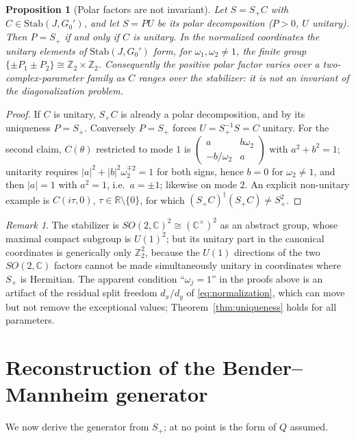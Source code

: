 \documentclass[11pt]{article}
\newtheorem{proposition}[theorem]{Proposition}
\theoremstyle{definition}
\theoremstyle{remark}
\newtheorem{remark}[theorem]{Remark}
\newcommand{\C}{\mathbb{C}}
\newcommand{\R}{\mathbb{R}}
\newcommand{\w}{\omega}
\newcommand{\Stab}{\mathrm{Stab}}
\newcommand{\dg}{\dagger}
\begin{document}
\begin{proposition}[Polar factors are not invariant]\label{prop:polar}
Let $S=S_+C$ with $C\in\Stab(J,G_0')$, and let $S=PU$ be its polar
decomposition ($P>0$, $U$ unitary).  Then $P=S_+$ if and only if $C$ is
unitary.  In the normalized coordinates the unitary elements of
$\Stab(J,G_0')$ form, for $\w_1,\w_2\neq1$, the finite group
$\{\pm P_1\pm P_2\}\cong\mathbb{Z}_2\times\mathbb{Z}_2$.  Consequently the
positive polar factor varies over a two-complex-parameter family as $C$
ranges over the stabilizer: it is not an invariant of the diagonalization
problem.
\end{proposition}

\begin{proof}
If $C$ is unitary, $S_+C$ is already a polar decomposition, and by its
uniqueness $P=S_+$.  Conversely $P=S_+$ forces $U=S_+^{-1}S=C$ unitary.  For
the second claim, $C(\theta)$ restricted to mode $1$ is
$\left(\begin{smallmatrix}a&b\w_2\\-b/\w_2&a\end{smallmatrix}\right)$ with
$a^2+b^2=1$; unitarity requires
$|a|^2+|b|^2\w_2^{\mp2}=1$ for both signs, hence $b=0$ for $\w_2\neq1$, and
then $|a|=1$ with $a^2=1$, i.e.\ $a=\pm1$; likewise on mode $2$.  An explicit
non-unitary example is $C(i\tau,0)$, $\tau\in\R\setminus\{0\}$, for which
$(S_+C)^{\dg}(S_+C)\neq S_+^2$.
\end{proof}

\begin{remark}
The stabilizer is $SO(2,\C)^2\cong(\C^{\times})^2$ as an abstract group,
whose maximal compact subgroup is $U(1)^2$; but its unitary part in the
canonical coordinates is generically only $\mathbb{Z}_2^2$, because the
$U(1)$ directions of the two $SO(2,\C)$ factors cannot be made
simultaneously unitary in coordinates where $S_+$ is Hermitian.  The apparent
condition ``$\w_j=1$'' in the proofs above is an artifact of the residual
split freedom $d_x/d_y$ of \eqref{eq:normalization}, which can move but not
remove the exceptional values; Theorem~\ref{thm:uniqueness} holds for all
parameters.
\end{remark}

\section{Reconstruction of the Bender--Mannheim generator}
\label{sec:reconstruction}

We now derive the generator from $S_+$; at no point is the form of $Q$
assumed.
\end{document}
